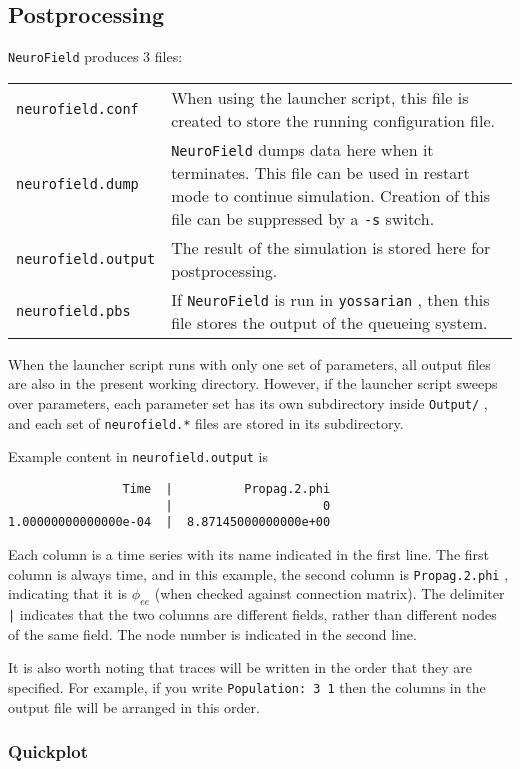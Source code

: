 \documentclass[12pt,a4paper]{article}
\newcommand{\type}[1]{ {\small\small\tt #1} }
\newcommand{\NF}[0]{ \type{NeuroField}}
\begin{document}
\subsection{Postprocessing}

\NF produces 3 files:

\begin{tabular}{l p{11.5cm}}
\type{neurofield.conf}& When using the launcher script, this file is created to store the running configuration file.\\
\type{neurofield.dump}& \NF dumps data here when it terminates. This file can be used in restart mode to continue simulation. Creation of this file can be suppressed by a \type{-s} switch.\\
\type{neurofield.output}& The result of the simulation is stored here for postprocessing.\\
\type{neurofield.pbs}& If \NF is run in \type{yossarian}, then this file stores the output of the queueing system.
\end{tabular}

When the launcher script runs with only one set of parameters, all output files are also in the present working directory. However, if the launcher script sweeps over parameters, each parameter set has its own subdirectory inside \type{Output/}, and each set of \type{neurofield.*} files are stored in its subdirectory.

Example content in \type{neurofield.output} is
\begin{lstlisting}
                Time  |          Propag.2.phi
                      |                     0
1.00000000000000e-04  |  8.87145000000000e+00
\end{lstlisting}

Each column is a time series with its name indicated in the first line. The first column is always time, and in this example, the second column is \type{Propag.2.phi}, indicating that it is $\phi_{ee}$ (when checked against connection matrix). The delimiter \type{|} indicates that the two columns are different fields, rather than different nodes of the same field. The node number is indicated in the second line.

It is also worth noting that traces will be written in the order that they are specified. For example, if you write \type{Population: 3 1} then the columns in the output file will be arranged in this order. 

\subsubsection{Quickplot}
\end{document}
